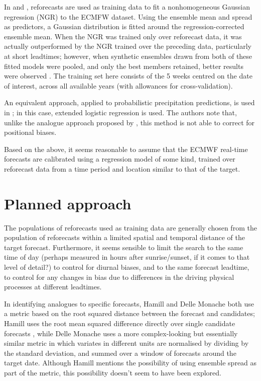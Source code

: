 \documentclass[10pt,fleqn]{article}
\begin{document}
In \cite{Hagedorn2008} and \cite{Hagedorn2012}, reforecasts are used as training data to fit a nonhomogeneous Gaussian regression (NGR) to the ECMFW dataset. Using the ensemble mean and spread as predictors, a Gaussian distribution is fitted around the regression-corrected ensemble mean. When the NGR was trained only over reforecast data, it was actually outperformed by the NGR trained over the preceding data, particularly at short leadtimes; however, when synthetic ensembles drawn from both of these fitted models were pooled, and only the best members retained, better results were observed \cite[\textit{\S3.3}]{Hagedorn2012}. The training set here consists of the 5 weeks centred on the date of interest, across all available years (with allowances for cross-validation).

An equivalent approach, applied to probabilistic precipitation predictions, is used in \cite{Hamill2012}; in this case, extended logistic regression is used. The authors note that, unlike the analogue approach proposed by \cite{Hamill2006}, this method is not able to correct for positional biases. 

Based on the above, it seems reasonable to assume that the ECMWF real-time forecasts are calibrated using a regression model of some kind, trained over reforecast data from a time period and location similar to that of the target.

\section{Planned approach}

The populations of reforecasts used as training data are generally chosen from the population of reforecasts within a limited spatial and temporal distance of the target forecast. Furthermore, it seems sensible to limit the search to the same time of day (perhaps measured in hours after sunrise/sunset, if it comes to that level of detail?) to control for diurnal biases, and to the same forecast leadtime, to control for any changes in bias due to differences in the driving physical processes at different leadtimes.

In identifying analogues to specific forecasts, Hamill and Delle Monache both use a metric based on the root squared distance between the forecast and candidates; Hamill uses the root mean squared difference directly over single candidate forecasts \cite{Hamill2006}, while Delle Monache uses a more complex-looking but essentially similar metric in which variates in different units are normalised by dividing by the standard deviation, and summed over a window of forecasts around the target date. Although Hamill mentions the possibility of using ensemble spread as part of the metric, this possibility doesn't seem to have been explored.
\end{document}
